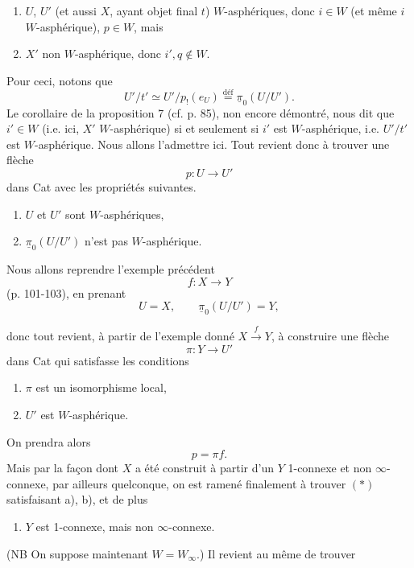 \begin{enumerate}[label=\alph*)]
\item $U$, $U'$ (et aussi $X$, ayant objet final $t$) $W$-asphériques, donc $i\in W$ (et même $i$ $W$-asphérique), $p\in W$, mais
\item $X'$ non $W$-asphérique, donc $i',q\notin W$.
\end{enumerate}

Pour ceci, notons que
\[ U'/t'\simeq U'/p_!(e_U)\overset{\text{déf}}{=}\underline{\pi}_0(U/U'). \]
Le corollaire de la proposition 7 (cf. p. 85), non encore démontré, nous dit que $i'\in W$ (i.e. ici, $X'$ $W$-asphérique) si et seulement si $i'$ est $W$-asphérique, i.e. $U'/t'$ est $W$-asphérique. Nous allons l'admettre ici. Tout revient donc à trouver une flèche
\[ p:U\longrightarrow U' \]
dans Cat avec les propriétés suivantes.

\begin{enumerate}[label=\alph*)]
\item $U$ et $U'$ sont $W$-asphériques,
\item $\underline{\pi}_0(U/U')$ n'est pas $W$-asphérique.
\end{enumerate}

Nous allons reprendre l'exemple précédent
\[ f:X\longrightarrow Y \]
(p. 101-103), en prenant
\[ U=X,\qquad \underline{\pi}_0(U/U')=Y, \]


donc tout revient, à partir de l'exemple donné $X\xrightarrow{f}Y$, à construire une flèche
\[ \pi:Y\longrightarrow U' \tag*{$(*)$} \]
dans Cat qui satisfasse les conditions

\begin{enumerate}[label=\alph*)]
\item $\pi$ est un isomorphisme local,
\item $U'$ est $W$-asphérique.
\end{enumerate}

On prendra alors
\[ p=\pi f. \]
Mais par la façon dont $X$ a été construit à partir d'un $Y$ 1-connexe et non $\infty$-connexe, par ailleurs quelconque, on est ramené finalement à trouver $(*)$ satisfaisant a), b), et de plus

\begin{enumerate}[label=\alph*), start=3]
\item {}
$Y$ est 1-connexe, mais non $\infty$-connexe.
\end{enumerate}

(NB On suppose maintenant $W=W_\infty$.) Il revient au même de trouver

